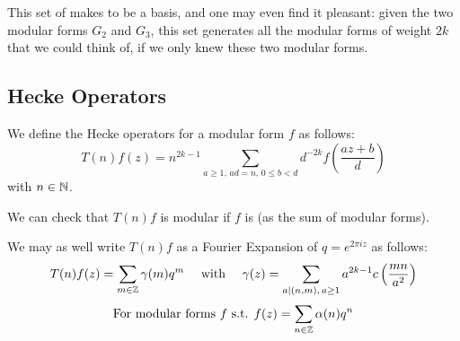 This set of makes to be a basis, and one may even find it pleasant: given the two modular forms $G_2$ and $G_3$, this set generates all the modular forms of weight $2k$ that we could think of, if we only knew these two modular forms.



\subsection{Hecke Operators}
\label{DefHeckeOperators}
We define the Hecke operators for a modular form $f$ as follows\cite[p.100]{CourseInArithmetic}:
$$
T(n)f(z) = n^{2k-1}\sum_{a \geq 1,\, ad=n,\, 0 \leq b < d} d^{-2k}f \left( \frac{az+b}{d} \right)
$$
with $n \in \mathbb{N}$.

We can check that $T(n)f$ is modular if $f$ is (as the sum of modular forms).


We may as well write $T(n)f$ as a Fourier Expansion of $q=e^{2 \pi i z}$ as follows\cite[p.100]{CourseInArithmetic}:
$$
T(n)f(z) = \sum_{m \in \mathbb{Z}} \gamma(m)q^m
\quad \text{ with } \quad 
\gamma(z) = \sum_{a | (n,m),\, a \geq 1} a^{2k-1} c\left( \frac{mn}{a^2} \right)
$$
$$
\text{For modular forms } f \text{ s.t. }
f(z) = \sum_{n \in \mathbb{Z}} \alpha(n)q^n
$$




